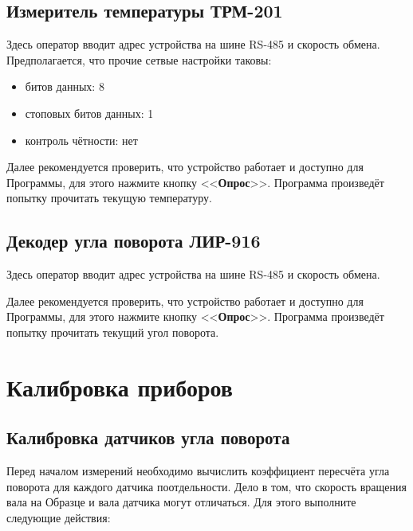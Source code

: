 \documentclass[12pt, a4paper, twocolumn]{report}
\newcommand{\CTL}[1]{<<{\bf #1}>>}
\begin{document}
\subsection{Измеритель температуры ТРМ-201}

Здесь оператор вводит адрес устройства на шине RS-485 и скорость обмена. Предполагается, что прочие сетвые настройки таковы:

\begin{itemize}
\item битов данных: 8
\item стоповых битов данных: 1
\item контроль чётности: нет
\end{itemize}

Далее рекомендуется проверить, что устройство работает и доступно для Программы, для этого нажмите кнопку \CTL{Опрос}. Программа произведёт попытку прочитать текущую температуру.

\subsection{Декодер угла поворота ЛИР-916}

Здесь оператор вводит адрес устройства на шине RS-485 и скорость обмена.

Далее рекомендуется проверить, что устройство работает и доступно для Программы, для этого нажмите кнопку \CTL{Опрос}. Программа произведёт попытку прочитать текущий угол поворота.

\section{Калибровка приборов}

\subsection{Калибровка датчиков угла поворота}

Перед началом измерений необходимо вычислить коэффициент пересчёта угла поворота для каждого датчика поотдельности. Дело в том, что скорость вращения вала на Образце и вала датчика могут отличаться. Для этого выполните следующие действия:
\end{document}
